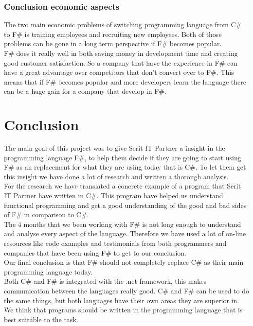 \documentclass[12pt, a4paper]{article}
\begin{document}
\newpage
\subsubsection{Conclusion economic aspects}
The two main economic problems of switching programming language from C\# to F\# is training employees and recruiting new employees. Both of those problems can be gone in a long term perspective if F\# becomes popular.\\

F\# does it really well in both saving money in development time and creating good customer satisfaction.  So a company that have the experience in F\# can have a great advantage over competitors that don't convert over to F\#. This means that if F\# becomes popular and more developers learn the language there can be a huge gain for a company that develop in F\#. 

\newpage

\section{Conclusion}
The main goal of this project was to give Serit IT Partner a insight in the programming language F\#, to help them decide if they are going to start using F\# as an replacement for what they are using today that is C\#. To let them get this insight we have done a lot of research and written a thorough analysis.\\

For the research we have translated a concrete example of a program that Serit IT Partner have written in C\#. This program have helped us understand functional programming and get a good understanding of the good and bad sides of F\# in comparison to C\#.\\

The 4 months that we been working with F\# is not long enough to understand and analyse every aspect of the language. Therefore we have used a lot of on-line resources like code examples and testimonials from both programmers and companies that have been using F\# to get to our conclusion.\\

Our final conclusion is that F\# should not completely replace C\# as their main programming language today.\\  

Both C\# and F\# is integrated with the .net framework, this makes communication between the languages really good. C\# and F\# can be used to do the same things, but both languages have their own areas they are superior in. We think that programs should be written in the programming language that is best suitable to the task.\\
\end{document}
